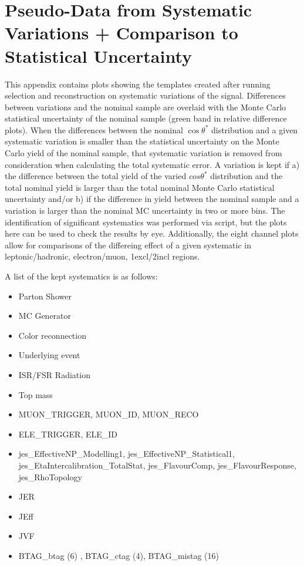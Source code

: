 \clearpage
\section{Pseudo-Data from Systematic Variations + Comparison to Statistical Uncertainty}
\label{app:systTemplates}
This appendix contains plots showing the templates created after running selection and reconstruction on systematic variations of the \ttbar signal. Differences between variations and the nominal sample are overlaid with the Monte Carlo statistical uncertainty of the nominal sample (green band in relative difference plots). When the differences between the nominal $\cos\theta^*$ distribution and a given systematic variation is smaller than the statistical uncertainty on the Monte Carlo yield of the nominal sample, that systematic variation is removed from consideration when calculating the total systematic error. A variation is kept if a) the difference between the total yield of the varied $cos\theta^*$ distribution and the total nominal yield is larger than the total nominal Monte Carlo statistical uncertainty and/or b) if the difference in yield between the nominal sample and a variation is larger than the nominal MC uncertainty in two or more bins. The identification of significant systematics was performed via script, but the plots here can be used to check the results by eye. Additionally, the eight channel plots allow for comparisons of the differeing effect of a given systematic in leptonic/hadronic, electron/muon, 1excl/2incl regions.

A list of the kept systematics is as follows:
\begin{itemize}
\item Parton Shower
\item MC Generator
\item Color reconnection
\item Underlying event
\item ISR/FSR \ttbar Radiation
\item Top mass
\item MUON\_TRIGGER, MUON\_ID, MUON\_RECO
\item ELE\_TRIGGER, ELE\_ID
\item jes\_EffectiveNP\_Modelling1, jes\_EffectiveNP\_Statistical1, jes\_EtaIntercalibration\_TotalStat, jes\_FlavourComp, jes\_FlavourResponse, jes\_RhoTopology
\item JER
\item JEff
\item JVF
\item BTAG\_btag (6) , BTAG\_ctag (4), BTAG\_mistag (16)

\end{itemize}

